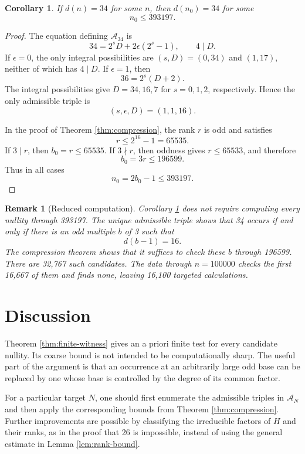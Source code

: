 \documentclass[a4paper]{article}
\newtheorem{corollary}[theorem]{Corollary}
\newtheorem{remark}[theorem]{Remark}
\begin{document}
\begin{corollary}\label{cor:34-bound}
	If $d(n)=34$ for some $n$, then $d(n_0)=34$ for some
	\[
		n_0\leq393197.
	\]
\end{corollary}

\begin{proof}
	The equation defining $\mathcal{A}_{34}$ is
	\[
		34=2^sD+2\epsilon(2^s-1),
		\qquad
		4\mid D.
	\]
	If $\epsilon=0$, the only integral possibilities are
	$(s,D)=(0,34)$ and $(1,17)$, neither of which has $4\mid D$.
	If $\epsilon=1$, then
	\[
		36=2^s(D+2).
	\]
	The integral possibilities give $D=34,16,7$ for $s=0,1,2$,
	respectively.
	Hence the only admissible triple is
	\[
		(s,\epsilon,D)=(1,1,16).
	\]

	In the proof of Theorem \ref{thm:compression}, the rank $r$ is odd
	and satisfies
	\[
		r\leq2^{16}-1=65535.
	\]
	If $3\mid r$, then $b_0=r\leq65535$.
	If $3\nmid r$, then oddness gives $r\leq65533$, and therefore
	\[
		b_0=3r\leq196599.
	\]
	Thus in all cases
	\[
		n_0=2b_0-1\leq393197.
	\]
\end{proof}

\begin{remark}[Reduced computation]
	Corollary \ref{cor:34-bound} does not require computing every
	nullity through 393197.
	The unique admissible triple shows that 34 occurs if and only if
	there is an odd multiple $b$ of 3 such that
	\[
		d(b-1)=16.
	\]
	The compression theorem shows that it suffices to check these $b$
	through 196599.
	There are 32,767 such candidates.
	The data through $n=100000$ checks the first 16,667 of them and
	finds none, leaving 16,100 targeted calculations.
\end{remark}

\section{Discussion}

Theorem \ref{thm:finite-witness} gives an a priori finite test for every
candidate nullity.
Its coarse bound is not intended to be computationally sharp.
The useful part of the argument is that an occurrence at an arbitrarily
large odd base can be replaced by one whose base is controlled by the
degree of its common factor.

For a particular target $N$, one should first enumerate the admissible
triples in $\mathcal{A}_N$ and then apply the corresponding bounds from
Theorem \ref{thm:compression}.
Further improvements are possible by classifying the irreducible factors
of $H$ and their ranks, as in the proof that 26 is impossible, instead of
using the general estimate in Lemma \ref{lem:rank-bound}.



\end{document}
